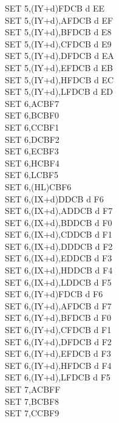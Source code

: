 \begin{multicols}{3}
{\begin{tabbing}
        SET 5,(IY+d)\>FDCB d EE\\
        SET 5,(IY+d),A\UNDOC\>FDCB d EF\\
        SET 5,(IY+d),B\UNDOC\>FDCB d E8\\
        SET 5,(IY+d),C\UNDOC\>FDCB d E9\\
        SET 5,(IY+d),D\UNDOC\>FDCB d EA\\
        SET 5,(IY+d),E\UNDOC\>FDCB d EB\\
        SET 5,(IY+d),H\UNDOC\>FDCB d EC\\
        SET 5,(IY+d),L\UNDOC\>FDCB d ED\\
        SET 6,A\>CBF7\\
        SET 6,B\>CBF0\\
        SET 6,C\>CBF1\\
        SET 6,D\>CBF2\\
        SET 6,E\>CBF3\\
        SET 6,H\>CBF4\\
        SET 6,L\>CBF5\\
        SET 6,(HL)\>CBF6\\
        SET 6,(IX+d)\>DDCB d F6\\
        SET 6,(IX+d),A\UNDOC\>DDCB d F7\\
        SET 6,(IX+d),B\UNDOC\>DDCB d F0\\
        SET 6,(IX+d),C\UNDOC\>DDCB d F1\\
        SET 6,(IX+d),D\UNDOC\>DDCB d F2\\
        SET 6,(IX+d),E\UNDOC\>DDCB d F3\\
        SET 6,(IX+d),H\UNDOC\>DDCB d F4\\
        SET 6,(IX+d),L\UNDOC\>DDCB d F5\\
        SET 6,(IY+d)\>FDCB d F6\\
        SET 6,(IY+d),A\UNDOC\>FDCB d F7\\
        SET 6,(IY+d),B\UNDOC\>FDCB d F0\\
        SET 6,(IY+d),C\UNDOC\>FDCB d F1\\
        SET 6,(IY+d),D\UNDOC\>FDCB d F2\\
        SET 6,(IY+d),E\UNDOC\>FDCB d F3\\
        SET 6,(IY+d),H\UNDOC\>FDCB d F4\\
        SET 6,(IY+d),L\UNDOC\>FDCB d F5\\
        SET 7,A\>CBFF\\
        SET 7,B\>CBF8\\
        SET 7,C\>CBF9\\

\end{tabbing}}
\end{multicols}
